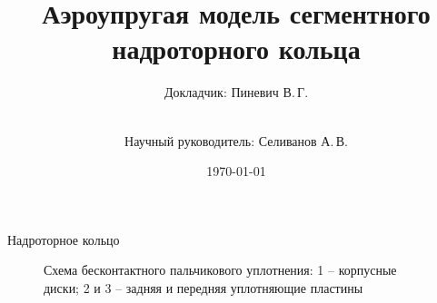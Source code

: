 \documentclass[ignoreonframetext,unicode]{beamer}
\title[Аэроупргугая модель]{Аэроупругая модель сегментного надроторного кольца}
\author[Пиневич В.\,Г.]{Докладчик: Пиневич В.\,Г.\and\\[0.5mm] Научный руководитель: Селиванов А.\,В.}
\institute[каф. Прикладная математика ФН-2]{группа ФН2-81Б}
\date{\today}
\begin{document}
	
	\begin{frame}[plain]
		\maketitle
	\end{frame}

	\begin{frame}{Надроторное кольцо}
		\begin{figure}[!htbp]
			\caption{Схема бесконтактного пальчикового уплотнения: 1 – корпусные
				диски; 2 и 3 – задняя и передняя уплотняющие пластины}
			\label{vved-2}
		\end{figure}
	\end{frame}
\end{document}
